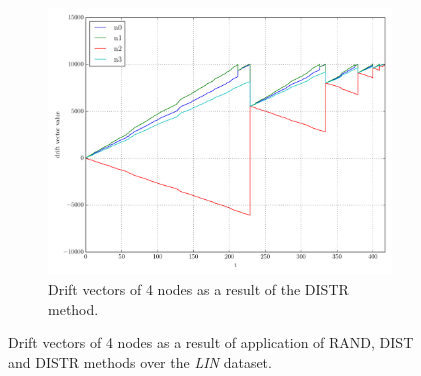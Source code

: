 \begin{figure}[!b]
\begin{subfigure}{0.32\textwidth}
  \includegraphics[width=\linewidth]{img/matchings_classic_distroptpair_drifts.pdf}
  \caption{Drift vectors of 4 nodes as a result of the DISTR method.}
\end{subfigure}
\vspace{0.5cm}
\caption{Drift vectors of 4 nodes as a result of application of RAND, DIST and DISTR methods over the \emph{LIN} dataset.} \label{fig:matchingComp-drifts}
\end{figure}
